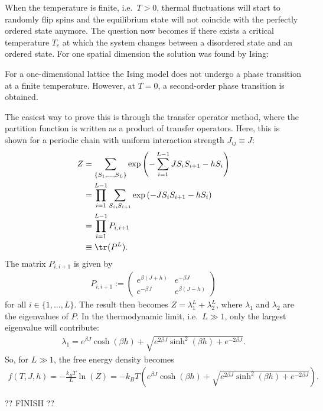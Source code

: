     When the temperature is finite, i.e.~$T>0$, thermal fluctuations will start to randomly flip spins and the equilibrium state will not coincide with the perfectly ordered state anymore. The question now becomes if there exists a critical temperature $T_c$ at which the system changes between a disordered state and an ordered state. For one spatial dimension the solution was found by Ising:
    \begin{property}[$d=1$]
        For a one-dimensional lattice the Ising model does not undergo a phase transition at a finite temperature. However, at $T=0$, a second-order phase transition is obtained.

        The easiest way to prove this is through the transfer operator method, where the partition function is written as a product of transfer operators. Here, this is shown for a periodic chain with uniform interaction strength $J_{ij}\equiv J$:
        \begin{align}
            Z &= \sum_{\{S_1,\ldots,S_L\}}\exp\left(-\sum_{i=1}^{L-1}JS_iS_{i+1}-hS_i\right)\\
            &= \prod_{i=1}^{L-1}\sum_{S_i,S_{i+1}}\exp\left(-JS_iS_{i+1}-hS_i\right)\\
            &= \prod_{i=1}^{L-1}P_{i,i+1}\\
            &\equiv\tr(P^L).
        \end{align}
        The matrix $P_{i,i+1}$ is given by
        \begin{gather}
            P_{i,i+1} :=
            \begin{pmatrix}
                e^{\beta(J+h)}&e^{-\beta J}\\
                e^{-\beta J}&e^{\beta(J-h)}
            \end{pmatrix}
        \end{gather}
        for all $i\in\{1,\ldots,L\}$. The result then becomes $Z=\lambda^L_1+\lambda^L_2$, where $\lambda_1$ and $\lambda_2$ are the eigenvalues of $P$. In the thermodynamic limit, i.e.~$L\gg1$, only the largest eigenvalue will contribute:
        \begin{gather}
            \lambda_1 = e^{\beta J}\cosh(\beta h) + \sqrt{e^{2\beta J}\sinh^2(\beta h)+e^{-2\beta J}}.
        \end{gather}
        So, for $L\gg1$, the free energy density becomes
        \begin{gather*}
            f(T,J,h) = -\frac{k_BT}{L}\ln(Z) = -k_BT\left(e^{\beta J}\cosh(\beta h) + \sqrt{e^{2\beta J}\sinh^2(\beta h)+e^{-2\beta J}}\right).
        \end{gather*}

        ?? FINISH ??
    \end{property}

